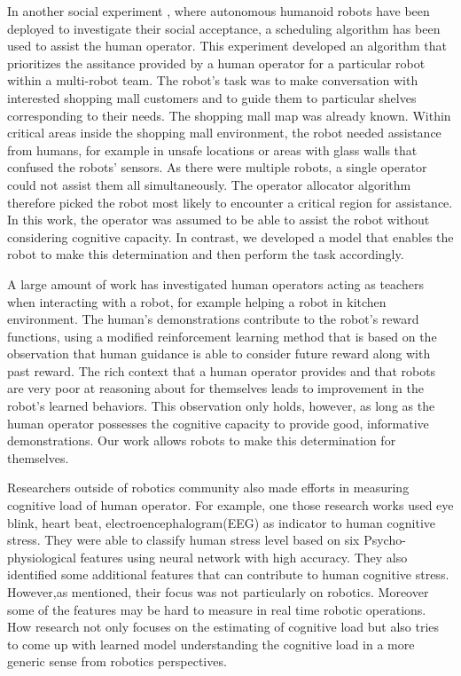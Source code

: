 \documentclass{sig-alternate}
\begin{document}
In another social experiment \cite{zheng2013supervisory}, where
autonomous humanoid robots have been deployed to investigate their
social acceptance, a scheduling algorithm has been used to assist the
human operator.  This experiment developed an algorithm that
prioritizes the assitance provided by a human operator for a
particular robot within a multi-robot team. The robot's task was to
make conversation with interested shopping mall customers and to guide
them to particular shelves corresponding to their needs. The shopping
mall map was already known.  Within critical areas inside the shopping
mall environment, the robot needed assistance from humans, for example
in unsafe locations or areas with glass walls that confused the
robots' sensors.  As there were multiple robots, a single operator
could not assist them all simultaneously.  The operator allocator
algorithm therefore picked the robot most likely to encounter a
critical region for assistance. In this work, the operator was assumed
to be able to assist the robot without considering cognitive
capacity. In contrast, we developed a model that enables the robot to
make this determination and then perform the task accordingly.

A large amount of work
\cite{thomaz2006reinforcement,thomaz2008teachable} has investigated
human operators acting as teachers when interacting with a robot, for
example helping a robot in kitchen environment. The human's
demonstrations contribute to the robot's reward functions, using a
modified reinforcement learning method that is based on the
observation that human guidance is able to consider future reward
along with past reward.  The rich context that a human operator
provides and that robots are very poor at reasoning about for
themselves leads to improvement in the robot's learned behaviors.
This observation only holds, however, as long as the human operator
possesses the cognitive capacity to provide good, informative
demonstrations.  Our work allows robots to make this determination for
themselves.

Researchers outside of robotics community also made efforts in measuring cognitive load
of human operator. For example, one those research works\cite{wilson2003real} used eye blink, heart beat, electroencephalogram(EEG) as indicator to human cognitive stress. They were able to classify human stress level based on six Psycho-physiological features using neural network with high accuracy. They also identified some additional features that can contribute to human cognitive stress. However,as mentioned, their focus was not particularly on robotics. Moreover some of the features may be hard to measure in real time robotic operations. How research not only focuses on the estimating of cognitive load but also tries to come up with learned model understanding the cognitive load in a more generic sense from robotics perspectives.  
\end{document}
